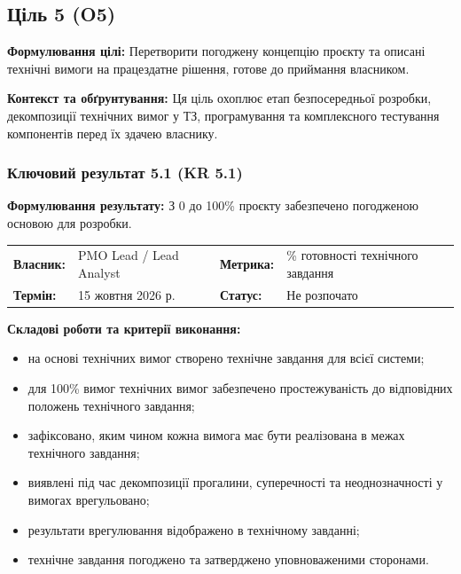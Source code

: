 \documentclass{article}
\begin{document}
\newpage

\subsection{Ціль 5 (O5)}

\textbf{Формулювання цілі:} Перетворити погоджену концепцію проєкту та описані технічні вимоги на працездатне рішення, готове до приймання власником.

\textbf{Контекст та обґрунтування:}
Ця ціль охоплює етап безпосередньої розробки, декомпозиції технічних вимог у ТЗ, програмування та комплексного тестування компонентів перед їх здачею власнику.

\subsubsection{Ключовий результат 5.1 (KR 5.1)}

\textbf{Формулювання результату:} З 0 до 100\% проєкту забезпечено погодженою основою для розробки.

\noindent\begin{tabular}{@{}p{2.2cm}p{4.5cm}p{2.2cm}p{4.5cm}@{}}
\toprule
\textbf{Власник:} & PMO Lead / Lead Analyst & \textbf{Метрика:} & \% готовності технічного завдання \\
\textbf{Термін:} & 15 жовтня 2026 р. & \textbf{Статус:} & Не розпочато \\
\bottomrule
\end{tabular}

\vspace{10pt}
\textbf{Складові роботи та критерії виконання:}
\begin{itemize}
    \item на основі технічних вимог створено технічне завдання для всієї системи;
    \item для 100\% вимог технічних вимог забезпечено простежуваність до відповідних положень технічного завдання;
    \item зафіксовано, яким чином кожна вимога має бути реалізована в межах технічного завдання;
    \item виявлені під час декомпозиції прогалини, суперечності та неоднозначності у вимогах врегульовано;
    \item результати врегулювання відображено в технічному завданні;
    \item технічне завдання погоджено та затверджено уповноваженими сторонами.
\end{itemize}
\end{document}
